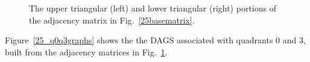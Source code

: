 \begin{figure}[H]
\begin{minipage}[c]{0.5\textwidth}
\centering
{}
\end{minipage}
\begin{minipage}[c]{0.5\textwidth}
\centering
{}
\end{minipage}
\caption{The upper triangular (left) and lower triangular (right) portions of the adjacency matrix in Fig.~\ref{25basematrix}.}
\label{25baseportionmatrices}
\end{figure}
Figure~\ref{25_q0q3graphs} shows the the DAGS associated with quadrants 0 and 3, built from the adjacency matrices in Fig.~\ref{25baseportionmatrices}.
